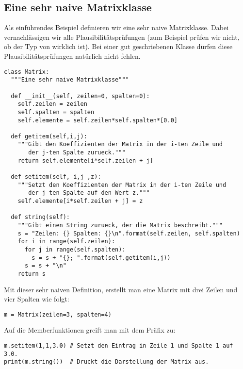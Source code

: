\subsection{Eine sehr naive Matrixklasse}
\label{section:klassen:eine_sehr_naive_matrixklasse}
Als einführendes Beispiel definieren wir eine sehr naive Matrixklasse.
Dabei ver\-nach\-läs\-sig\-en wir alle Plausibilitätsprüfungen
(zum Beispiel prüfen wir nicht, ob der Typ von  wirklich  ist).
Bei einer gut geschriebenen Klasse dürfen diese Plausibilitätsprüfungen natürlich nicht fehlen.
\begin{lstlisting}
class Matrix:
  """Eine sehr naive Matrixklasse"""
  
  def __init__(self, zeilen=0, spalten=0):
    self.zeilen = zeilen
    self.spalten = spalten
    self.elemente = self.zeilen*self.spalten*[0.0]
  
  def getitem(self,i,j):
    """Gibt den Koeffizienten der Matrix in der i-ten Zeile und
       der j-ten Spalte zurueck."""
    return self.elemente[i*self.zeilen + j]
  
  def setitem(self, i,j ,z):
    """Setzt den Koeffizienten der Matrix in der i-ten Zeile und
       der j-ten Spalte auf den Wert z."""
    self.elemente[i*self.zeilen + j] = z
  
  def string(self):
    """Gibt einen String zurueck, der die Matrix beschreibt."""
    s = "Zeilen: {} Spalten: {}\n".format(self.zeilen, self.spalten)
    for i in range(self.zeilen):
      for j in range(self.spalten):
        s = s + "{}; ".format(self.getitem(i,j))
      s = s + "\n"
    return s
\end{lstlisting}
Mit dieser sehr naiven Definition, erstellt man eine Matrix mit drei Zeilen und vier Spalten wie folgt:
\begin{lstlisting}
m = Matrix(zeilen=3, spalten=4)
\end{lstlisting}
Auf die Memberfunktionen greift man mit dem Präfix  zu:
\begin{lstlisting}
m.setitem(1,1,3.0) # Setzt den Eintrag in Zeile 1 und Spalte 1 auf 3.0.
print(m.string())  # Druckt die Darstellung der Matrix aus.
\end{lstlisting}
